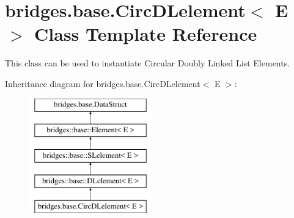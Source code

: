 \hypertarget{classbridges_1_1base_1_1_circ_d_lelement}{}\section{bridges.\+base.\+Circ\+D\+Lelement$<$ E $>$ Class Template Reference}
\label{classbridges_1_1base_1_1_circ_d_lelement}


This class can be used to instantiate Circular Doubly Linked List Elements.  


Inheritance diagram for bridges.\+base.\+Circ\+D\+Lelement$<$ E $>$\+:\begin{figure}[H]
\begin{center}
\leavevmode
\includegraphics[height=5.000000cm]{classbridges_1_1base_1_1_circ_d_lelement}
\end{center}
\end{figure}
